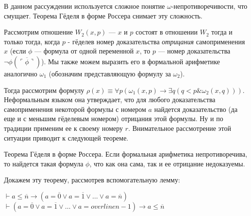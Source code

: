 В данном рассуждении используется сложное понятие
$\omega$-непротиворечивости, что смущает. Теорема Гёделя в форме 
Россера снимает эту сложность.

Рассмотрим отношение $W_2 (x,p)$ --- $x$ и $p$ состоят в отношении $W_2$ тогда и только тогда, когда
$p$ - гёделев номер доказательства \emph{отрицания} самоприменения $x$ (если $\phi$ --- формула от
одной переменной $x$, то $p$ --- номер доказательства $\neg \phi(\overline{\ulcorner\phi\urcorner})$). 
Мы также можем выразить его в формальной арифметике аналогично $\omega_1$
(обозначим представляющую формулу за $\omega_2$).

Тогда рассмотрим формулу $\rho(x) \equiv \forall p (\omega_1 (x,p) \rightarrow \exists q (q < p \& \omega_2 (x,q)))$.
Неформальным языком она утверждает, что для любого доказательства самоприменения некоторой 
формулы с номером $a$ найдется доказательство (да еще и с меньшим гёделевым номером) 
отрицания этой формулы. Ну и по традиции применим ее к своему номеру $r$. 
Внимательное рассмотрение этой ситуации приводит к следующей теореме.

\begin{theorem}{Теорема Гёделя в форме Россера.}
Если формальная арифметика непротиворечива, то 
найдется такая формула $\phi$, что как она сама, так и ее отрицание
недоказуемы.
\end{theorem}

Докажем эту теорему, рассмотрев вспомогательную лемму:
\begin{lemma}
$\vdash a \le \overline{n} \rightarrow (a=\overline{0} \vee a=\overline{1} \vee \dots \vee a=\overline{n})$ 
$\vdash (a=\overline{0} \vee a=\overline{1} \vee \dots \vee a=overline{n-1}) \rightarrow a\le\overline{n}$ 
\end{lemma}


